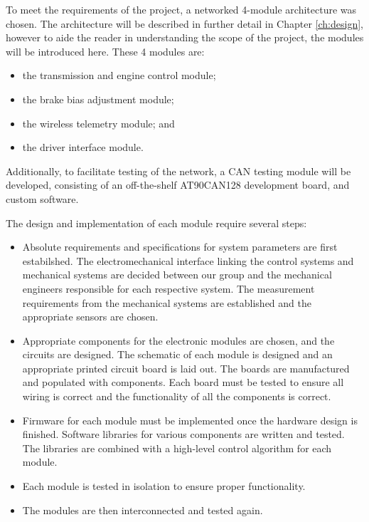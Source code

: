 To meet the requirements of the project, a networked 4-module architecture was chosen. The architecture will be described in further detail in Chapter \ref{ch:design}, however to aide the reader in understanding the scope of the project, the modules will be introduced here. These 4 modules are:

\begin{itemize}
\item the transmission and engine control module;
\item the brake bias adjustment module;
\item the wireless telemetry module; and
\item the driver interface module.
\end{itemize}

Additionally, to facilitate testing of the network, a CAN testing module will be developed, consisting of an off-the-shelf AT90CAN128 development board, and custom software.

The design and implementation of each module require several steps:

\begin{itemize}

\item Absolute requirements and specifications for system parameters are first estabilshed. The electromechanical interface linking the control systems and mechanical systems are decided between our group and the mechanical engineers responsible for each respective system. The measurement requirements from the mechanical systems are established and the appropriate sensors are chosen.

\item Appropriate components for the electronic modules are chosen, and the circuits are designed. The schematic of each module is designed and an appropriate printed circuit board is laid out. The boards are manufactured and populated with components. Each board must be tested to ensure all wiring is correct and the functionality of all the components is correct.

\item Firmware for each module must be implemented once the hardware design is finished. Software libraries for various components are written and tested. The libraries are combined with a high-level control algorithm for each module.
 
\item Each module is tested in isolation to ensure proper functionality. 

\item The modules are then interconnected and tested again.

\end{itemize}

